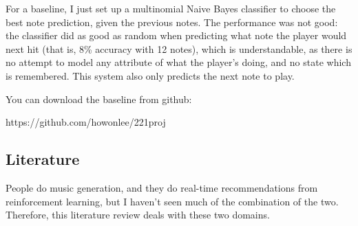 \documentclass{article}
\begin{document}
For a baseline, I just set up a multinomial Naive Bayes classifier to choose the best note prediction, given the previous notes. The performance was not good: the classifier did as good as random when predicting what note the player would next hit (that is, 8\% accuracy with 12 notes), which is understandable, as there is no attempt to model any attribute of what the player's doing, and no state which is remembered. This system also only predicts the next note to play.

You can download the baseline from github:

https://github.com/howonlee/221proj

\subsection*{Literature}
People do music generation, and they do real-time recommendations from reinforcement learning, but I haven't seen much of the combination of the two. Therefore, this literature review deals with these two domains.
\end{document}
